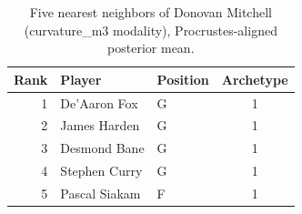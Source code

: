 \begin{table}[htbp]
  \centering\small
  \begin{tabular}{rllc}
    \toprule
    Rank & Player & Position & Archetype \\
    \midrule
    1 & De'Aaron Fox & G & 1 \\
    2 & James Harden & G & 1 \\
    3 & Desmond Bane & G & 1 \\
    4 & Stephen Curry & G & 1 \\
    5 & Pascal Siakam & F & 1 \\
    \bottomrule
  \end{tabular}
  \caption{Five nearest neighbors of Donovan Mitchell (curvature_m3 modality), Procrustes-aligned posterior mean.}
  \label{tab:Donovan_Mitchell_neighbors_curvature_m3}
\end{table}

